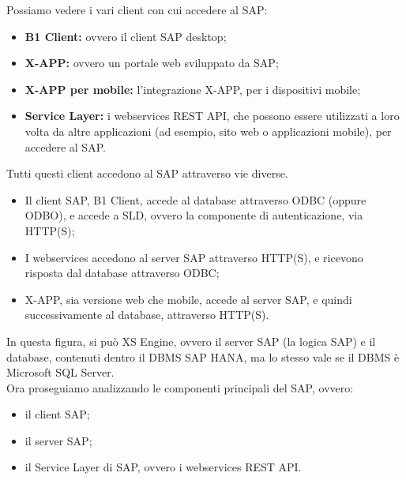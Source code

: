 Possiamo vedere i vari client con cui accedere al SAP:
\begin{itemize}
	\item \textbf{B1 Client:} ovvero il client SAP desktop;
	\item \textbf{X-APP:} ovvero un portale web sviluppato da SAP;
	\item \textbf{X-APP per mobile:} l'integrazione X-APP, per i dispositivi mobile;
	\item \textbf{Service Layer:} i webservices REST API, che possono essere utilizzati a loro volta da altre applicazioni (ad esempio, sito web o applicazioni mobile), per accedere al SAP.
\end{itemize}
Tutti questi client accedono al SAP attraverso vie diverse.
\begin{itemize}
	\item Il client SAP, B1 Client, accede al database attraverso ODBC (oppure ODBO), e accede a SLD, ovvero la componente di autenticazione, via HTTP(S);
	\item I webservices accedono al server SAP attraverso HTTP(S), e ricevono risposta dal database attraverso ODBC;
	\item X-APP, sia versione web che mobile, accede al server SAP, e quindi successivamente al database, attraverso HTTP(S).
\end{itemize}
In questa figura, si può XS Engine, ovvero il server SAP (la logica SAP) e il database, contenuti dentro il DBMS SAP HANA, ma lo stesso vale se il DBMS è Microsoft SQL Server.\\
Ora proseguiamo analizzando le componenti principali del SAP, ovvero:
\begin{itemize}
	\item il client SAP;
	\item il server SAP;
	\item il Service Layer di SAP, ovvero i webservices REST API.
\end{itemize}
\newpage
